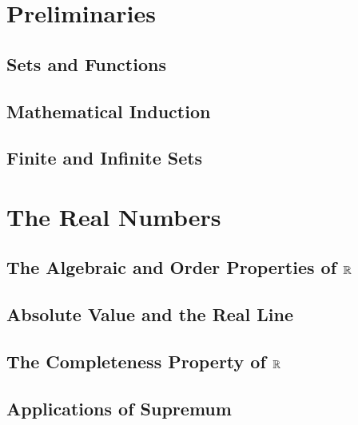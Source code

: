 \documentclass[a4paper,12pt]{article}
\begin{document}
\maketitle

\newpage

\section{Preliminaries}

\newpage

\subsection{Sets and Functions}

\newpage

\subsection{Mathematical Induction}

\newpage

\subsection{Finite and Infinite Sets}

\newpage

\section{The Real Numbers}

\newpage

\subsection{The Algebraic and Order Properties of $\mathbb{R}$}

\newpage

\subsection{Absolute Value and the Real Line}

\newpage

\subsection{The Completeness Property of $\mathbb{R}$}


\newpage

\subsection{Applications of Supremum}
\end{document}
